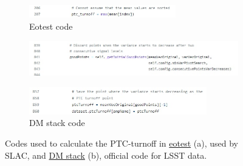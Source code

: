 \begin{figure}[!htb]
     \begin{subfigure}[b]{\textwidth}
         
         \includegraphics[width=0.7\textwidth,left]{Figures/eotest_turnoff.jpg}
         \caption{Eotest code}
     \end{subfigure}
     \vspace{3mm}
     \begin{subfigure}[b]{\textwidth}
         
         \includegraphics[width=\textwidth,left]{Figures/DMstack_turnoff1.jpg}
     \end{subfigure}    
     \vspace{3mm}
     \begin{subfigure}[b]{\textwidth}
         
         \includegraphics[width=0.85\textwidth,left]{Figures/DMstack_turnoff2.jpg}
         \caption{DM stack code}
     \end{subfigure}
        \caption{Codes used to calculate the PTC-turnoff in \href{https://github.com/lsst-camera-dh/eotest/blob/32c17b0a33b9c099651ed581ee90c1b1101012fb/python/lsst/eotest/sensor/ptcTask.py}{eotest}  (a), used by SLAC, and \href{https://github.com/lsst/cp_pipe/blob/6bae47012f2f119b186509ce7efd963b68b61f0d/python/lsst/cp/pipe/ptc/cpSolvePtcTask.py}{DM stack} (b), official code for LSST data.}
        \label{fig:Turnoff_codes}
\end{figure}


